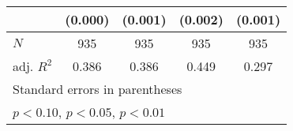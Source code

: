 {\begin{tabular}{l*{4}{c}}
            &     (0.000)         &     (0.001)         &     (0.002)         &     (0.001)         \\
\hline
\(N\)       &         935         &         935         &         935         &         935         \\
adj. \(R^{2}\)&       0.386         &       0.386         &       0.449         &       0.297         \\
\hline\hline
\multicolumn{5}{l}{\footnotesize Standard errors in parentheses}\\
\multicolumn{5}{l}{\footnotesize \sym{*} \(p<0.10\), \sym{**} \(p<0.05\), \sym{***} \(p<0.01\)}\\
\end{tabular}
}
